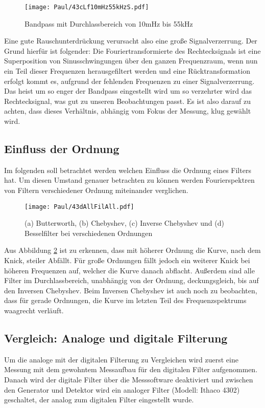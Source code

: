 \begin{figure}[h]
    \centering
    \texttt{[image: Paul/43cLf10mHz55kHzS.pdf]}
    \caption{Bandpass mit Durchlassbereich von 10mHz bis 55kHz}
    \label{fig:43cBeBa}
\end{figure}

Eine gute Rauschunterdrückung verursacht also eine große Signalverzerrung. Der Grund hierfür ist folgender: Die Fouriertransformierte des Rechtecksignals ist eine Superposition von Sinusschwingungen über den ganzen Frequenzraum, wenn nun ein Teil dieser Frequenzen herausgefiltert werden und eine Rücktransformation erfolgt kommt es, aufgrund der fehlenden Frequenzen zu einer Signalverzerrung. Das heist um so enger der Bandpass eingestellt wird um so verzehrter wird das Rechtecksignal, was gut zu unseren Beobachtungen passt. Es ist also darauf zu achten, dass dieses Verhältnis, abhängig vom Fokus der Messung, klug gewählt wird.

\newpage
\subsection{Einfluss der Ordnung}
\label{chap:Einfl-d-Ord}
Im folgenden soll betrachtet werden welchen Einfluss die Ordnung eines Filters hat.
Um diesen Umstand genauer betrachten zu können werden Fourierspektren von Filtern verschiedener Ordnung miteinander verglichen.
\begin{figure}[h]
    \centering
    \texttt{[image: Paul/43dAllFilAll.pdf]}
    \caption{(a) Butterworth, (b) Chebyshev, (c) Inverse Chebyshev und (d) Besselfilter bei verschiedenen Ordnungen}
    \label{fig:43dOrd}
\end{figure}

Aus Abbildung \ref{fig:43dOrd} ist zu erkennen, dass mit höherer Ordnung die Kurve, nach dem Knick, steiler Abfällt.
Für große Ordnungen fällt jedoch ein weiterer Knick bei höheren Frequenzen auf, welcher die Kurve danach abflacht. Außerdem sind alle Filter im Durchlassbereich, unabhängig von der Ordnung, deckungsgleich, bis auf den Inversen Chebyshev. Beim Inversen Chebyshev ist auch noch zu beobachten, dass für gerade Ordnungen, die Kurve im letzten Teil des Frequenzspektrums waagrecht verläuft.

\newpage
\subsection{Vergleich: Analoge und digitale Filterung}
Um die analoge mit der digitalen Filterung zu Vergleichen wird zuerst eine Messung mit dem gewohntem Messaufbau für den digitalen Filter aufgenommen. Danach wird der digitale Filter über die Messsoftware deaktiviert und zwischen den Generator und Detektor wird ein analoger Filter (Modell: Ithaco 4302) geschaltet, der analog zum digitalen Filter eingestellt wurde.

